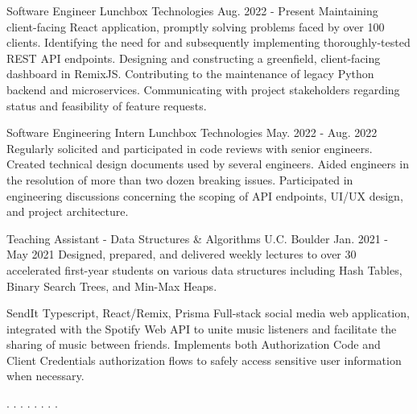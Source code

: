 \begin{divider}
  \begin{pridepoint}
    {Software Engineer}
    {Lunchbox Technologies}
    {Aug. 2022 - Present}
    \li Maintaining client-facing React application, promptly solving problems faced by over 100 clients.
    \li Identifying the need for and subsequently implementing thoroughly-tested REST API endpoints.
    \li Designing and constructing a greenfield, client-facing dashboard in RemixJS. 
    \li Contributing to the maintenance of legacy Python backend and microservices.
    \li Communicating with project stakeholders regarding status and feasibility of feature requests.
  \end{pridepoint}
  \begin{pridepoint}
    {Software Engineering Intern}
    {Lunchbox Technologies}
    {May. 2022 - Aug. 2022}
    \li Regularly solicited and participated in code reviews with senior engineers.
    \li Created technical design documents used by several engineers. %
    \li Aided engineers in the resolution of more than two dozen breaking issues.%
    \li Participated in engineering discussions concerning the scoping of API endpoints, UI/UX design, and project architecture.
  \end{pridepoint}
  \begin{pridepoint}
    {Teaching Assistant - Data Structures \& Algorithms}
    {U.C. Boulder}
    {Jan. 2021 - May 2021}
    \li Designed, prepared, and delivered weekly lectures to over 30 accelerated first-year students on various data structures including Hash Tables, Binary Search Trees, and Min-Max Heaps. %
  \end{pridepoint}
\end{divider}
\begin{divider}[Projects]
  \begin{pridepoint}
    {SendIt}
    {Typescript, React/Remix, Prisma}
    {}
    \li Full-stack social media web application, integrated with the Spotify Web API to unite music listeners and facilitate the sharing of music between friends.
    \li Implements both Authorization Code and Client Credentials authorization flows to safely access sensitive user information when necessary.
  \end{pridepoint}
\end{divider}
\begin{divider}
  \vspace{-4mm}
  \begin{multicols}{2}
    \begin{itemize} \setlength\itemsep{-0.3em}\setlength\columnseprule{10pt}
      .
      .
      .
      . 
      .
      .
      .
      .
    \end{itemize}  
  \end{multicols}
\end{divider} 
